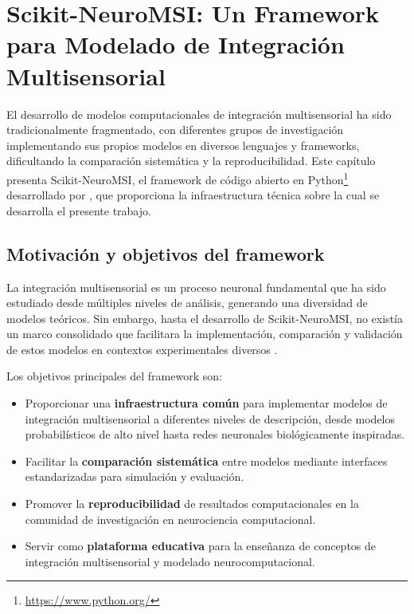 \chapter{Scikit-NeuroMSI: Un Framework para Modelado de Integración Multisensorial}
\label{chapter:scikit_neuromsi}

El desarrollo de modelos computacionales de integración multisensorial ha sido tradicionalmente fragmentado, con diferentes grupos de investigación implementando sus propios modelos en diversos lenguajes y frameworks, dificultando la comparación sistemática y la reproducibilidad. Este capítulo presenta Scikit-NeuroMSI, el framework de código abierto en Python\footnote{\url{https://www.python.org/}} desarrollado por \citeauthor{paredes2025scikit}, que proporciona la infraestructura técnica sobre la cual se desarrolla el presente trabajo.


\section{Motivación y objetivos del framework}
\label{sec:snmsi_motivacion}

La integración multisensorial es un proceso neuronal fundamental que ha sido estudiado desde múltiples niveles de análisis, generando una diversidad de modelos teóricos. Sin embargo, hasta el desarrollo de Scikit-NeuroMSI, no existía un marco consolidado que facilitara la implementación, comparación y validación de estos modelos en contextos experimentales diversos \citep{paredes2025scikit}.

Los objetivos principales del framework son:

\begin{itemize}
\item Proporcionar una \textbf{infraestructura común} para implementar modelos de integración multisensorial a diferentes niveles de descripción, desde modelos probabilísticos de alto nivel hasta redes neuronales biológicamente inspiradas.

\item Facilitar la \textbf{comparación sistemática} entre modelos mediante interfaces estandarizadas para simulación y evaluación.

\item Promover la \textbf{reproducibilidad} de resultados computacionales en la comunidad de investigación en neurociencia computacional.

\item Servir como \textbf{plataforma educativa} para la enseñanza de conceptos de integración multisensorial y modelado neurocomputacional.
\end{itemize}

